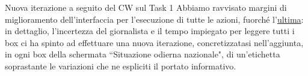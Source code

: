 \begin{bclogo}{Nuova iterazione a seguito del CW sul Task 1}
    Abbiamo ravvisato margini di miglioramento dell'interfaccia per l'esecuzione di tutte le azioni, fuorché l'\hyperref[cw1:f]{ultima}: in dettaglio, l'incertezza del giornalista e il tempo impiegato per leggere tutti i box ci ha spinto ad effettuare una nuova iterazione, concretizzatasi nell'aggiunta, in ogni box della schermata ``Situazione odierna nazionale", di un'etichetta soprastante le variazioni che ne espliciti il portato informativo.
\end{bclogo}